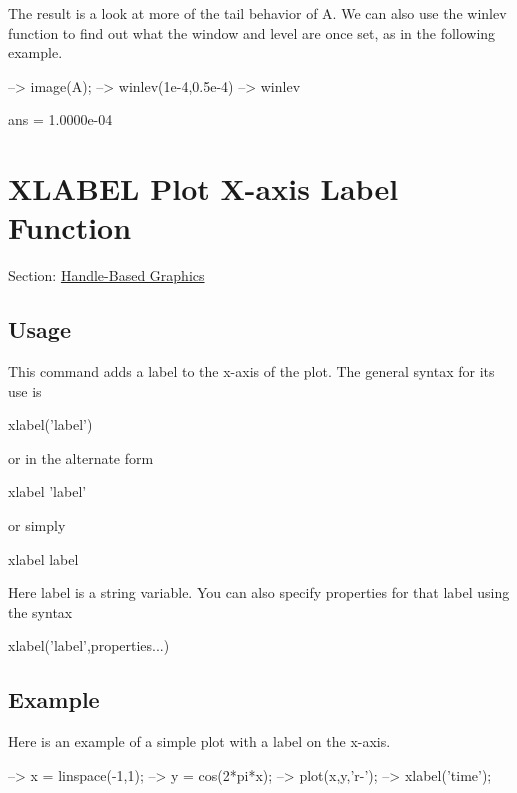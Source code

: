 The result is a look at more of the tail behavior of {\ttfamily A}. We can also use the winlev function to find out what the window and level are once set, as in the following example.


\begin{DoxyVerbInclude}
--> image(A);
--> winlev(1e-4,0.5e-4)
--> winlev

ans = 
 1.0000e-04 
\end{DoxyVerbInclude}
 \hypertarget{handle_xlabel}{}\section{X\-L\-A\-B\-E\-L Plot X-\/axis Label Function}\label{handle_xlabel}
Section\-: \hyperlink{sec_handle}{Handle-\/\-Based Graphics} \hypertarget{vtkwidgets_vtkxyplotwidget_Usage}{}\subsection{Usage}\label{vtkwidgets_vtkxyplotwidget_Usage}
This command adds a label to the x-\/axis of the plot. The general syntax for its use is \begin{DoxyVerb}  xlabel('label')
\end{DoxyVerb}
 or in the alternate form \begin{DoxyVerb}  xlabel 'label'
\end{DoxyVerb}
 or simply \begin{DoxyVerb}  xlabel label
\end{DoxyVerb}
 Here {\ttfamily label} is a string variable. You can also specify properties for that label using the syntax \begin{DoxyVerb}  xlabel('label',properties...) 
\end{DoxyVerb}
 \hypertarget{variables_struct_Example}{}\subsection{Example}\label{variables_struct_Example}
Here is an example of a simple plot with a label on the {\ttfamily x}-\/axis.


\begin{DoxyVerbInclude}
--> x = linspace(-1,1);
--> y = cos(2*pi*x);
--> plot(x,y,'r-');
--> xlabel('time');
\end{DoxyVerbInclude}


